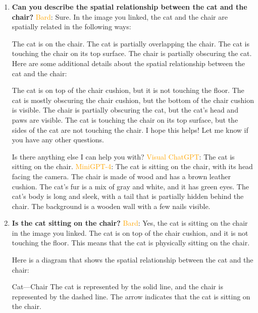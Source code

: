     \begin{enumerate}
        \item \textbf{Can you describe the spatial relationship between the cat and the chair?}
        \subitem \textcolor{orange}{Bard}: Sure. In the image you linked, the cat and the chair are spatially related in the following ways:

        The cat is on the chair.
        The cat is partially overlapping the chair.
        The cat is touching the chair on its top surface.
        The chair is partially obscuring the cat.
        Here are some additional details about the spatial relationship between the cat and the chair:
        
        The cat is on top of the chair cushion, but it is not touching the floor.
        The cat is mostly obscuring the chair cushion, but the bottom of the chair cushion is visible.
        The chair is partially obscuring the cat, but the cat's head and paws are visible.
        The cat is touching the chair on its top surface, but the sides of the cat are not touching the chair.
        I hope this helps! Let me know if you have any other questions.
        
        Is there anything else I can help you with?
        \subitem \textcolor{orange}{Visual ChatGPT}: The cat is sitting on the chair.
        \subitem \textcolor{orange}{MiniGPT-4}: The cat is sitting on the chair, with its head facing the camera. The chair is made of wood and has a brown leather cushion. The cat’s fur is a mix of gray and white, and it has green eyes. The cat’s body is long and sleek, with a tail that is partially hidden behind the chair. The background is a wooden wall with a few nails visible.
        \item \textbf{Is the cat sitting on the chair?}
        \subitem \textcolor{orange}{Bard}:     
        Yes, the cat is sitting on the chair in the image you linked. The cat is on top of the chair cushion, and it is not touching the floor. This means that the cat is physically sitting on the chair.

        Here is a diagram that shows the spatial relationship between the cat and the chair:

        Cat---Chair
        The cat is represented by the solid line, and the chair is represented by the dashed line. The arrow indicates that the cat is sitting on the chair.


\end{enumerate}
